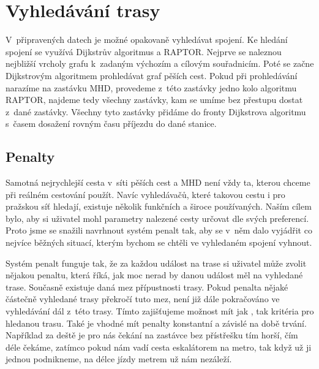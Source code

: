 \chapter{Vyhledávání trasy}
V~připravených datech je možné opakovaně vyhledávat spojení. Ke hledání spojení
se využívá Dijkstrův algoritmus a RAPTOR. Nejprve se naleznou nejbližší vrcholy
grafu k~zadaným výchozím a cílovým souřadnicím. Poté se začne Dijkstrovým
algoritmem prohledávat graf pěších cest. Pokud při prohledávání narazíme na
zastávku MHD, provedeme z~této zastávky jedno kolo algoritmu RAPTOR, najdeme
tedy všechny zastávky, kam se umíme bez přestupu dostat z~dané zastávky. Všechny
tyto zastávky přidáme do fronty Dijkstrova algoritmu s~časem dosažení rovným
času příjezdu do dané stanice. 

\section{Penalty}
Samotná nejrychlejší cesta v~síti pěších cest a MHD není vždy ta, kterou chceme
při reálném cestování použít. Navíc vyhledávačů, které takovou cestu i pro
pražskou síť hledají, existuje několik funkčních a široce používaných. Naším
cílem bylo, aby si uživatel mohl parametry nalezené cesty určovat dle svých
preferencí. Proto jsme se snažili navrhnout systém penalt tak, aby se v~něm dalo
vyjádřit co nejvíce běžných situací, kterým bychom se chtěli ve vyhledaném
spojení vyhnout. 

Systém penalt funguje tak, že za každou událost na trase si uživatel může zvolit
nějakou penaltu, která říká, jak moc nerad by danou událost měl na vyhledané
trase. Současně existuje daná mez přípustnosti trasy. Pokud penalta nějaké
částečně vyhledané trasy překročí tuto mez, není již dále pokračováno ve
vyhledávání dál z~této trasy. Tímto zajišťujeme možnost mít jak , tak
 kritéria pro hledanou trasu. Také je vhodné mít penalty konstantní a
závislé na době trvání. Například za deště je pro nás čekání na zastávce bez
přístřešku tím horší, čím déle čekáme, zatímco pokud nám vadí cesta eskalátorem
na metro, tak když už ji jednou podnikneme, na délce jízdy metrem už nám
nezáleží.

